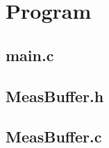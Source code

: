 \documentclass[fleqn]{article}
\begin{document}
\section{Program}
\subsection{main.c}

\begin{minipage}[t]{.49\textwidth}
	
\end{minipage}\hfill
\noindent\begin{minipage}[t]{.49\textwidth}
	
\end{minipage}\hfill

\begin{minipage}[t]{.49\textwidth}
	
\end{minipage}\hfill
\noindent\begin{minipage}[t]{.49\textwidth}
	\subsection{MeasBuffer.h}
	
	\subsection{MeasBuffer.c}
	
\end{minipage}\hfill
\end{document}

